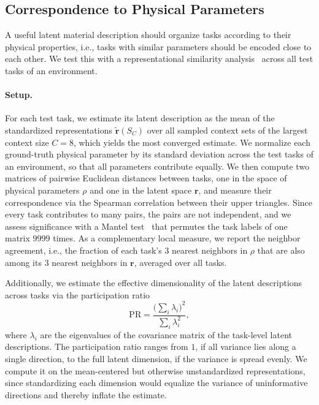 \subsection{Correspondence to Physical Parameters}
\label{app:rsa}

A useful latent material description should organize tasks according to their physical properties, i.e., tasks with similar parameters should be encoded close to each other. We test this with a representational similarity analysis~\citep{kriegeskorte2008rsa} across all test tasks of an environment.

\paragraph{Setup.}
For each test task, we estimate its latent description as the mean of the standardized representations $\tilde{\mathbf{r}}(S_C)$ over all sampled context sets of the largest context size $C=8$, which yields the most converged estimate. We normalize each ground-truth physical parameter by its standard deviation across the test tasks of an environment, so that all parameters contribute equally. We then compute two matrices of pairwise Euclidean distances between tasks, one in the space of physical parameters $\rho$ and one in the latent space $\mathbf{r}$, and measure their correspondence via the Spearman correlation between their upper triangles. Since every task contributes to many pairs, the pairs are not independent, and we assess significance with a Mantel test~\citep{mantel1967detection} that permutes the task labels of one matrix $9999$ times. As a complementary local measure, we report the neighbor agreement, i.e., the fraction of each task's $3$ nearest neighbors in $\rho$ that are also among its $3$ nearest neighbors in $\mathbf{r}$, averaged over all tasks.

Additionally, we estimate the effective dimensionality of the latent descriptions across tasks via the participation ratio
\begin{equation*}
    \mathrm{PR} = \frac{\bigl(\sum_i \lambda_i\bigr)^2}{\sum_i \lambda_i^2} ,
\end{equation*}
where $\lambda_i$ are the eigenvalues of the covariance matrix of the task-level latent descriptions. The participation ratio ranges from $1$, if all variance lies along a single direction, to the full latent dimension, if the variance is spread evenly. We compute it on the mean-centered but otherwise unstandardized representations, since standardizing each dimension would equalize the variance of uninformative directions and thereby inflate the estimate.

